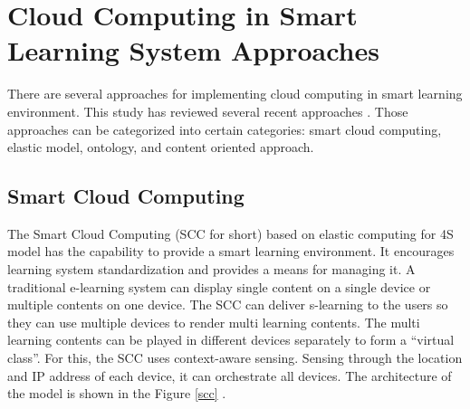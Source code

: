 \documentclass[journal]{vgtc}                %
\begin{document}
\section{Cloud Computing in Smart Learning System Approaches}
There are several approaches for implementing cloud computing in smart learning environment. This study has reviewed several recent approaches \cite{Kim2013,s110807835,jeong2013content,jeong2013cloud,nasr2012proposed}. Those approaches can be categorized into certain categories: smart cloud computing, elastic model, ontology, and content oriented approach.


  \subsection{Smart Cloud Computing}
  The Smart Cloud Computing (SCC for short) based on elastic computing for 4S model has the capability to provide a smart learning environment. It encourages learning system standardization and provides a means for managing it. A traditional e-learning system can display single content on a single device or multiple contents on one device. The SCC can deliver s-learning to the users so they can use multiple devices to render multi learning contents. The multi learning contents can be played in different devices separately to form a “virtual class”. For this, the SCC uses context-aware sensing. Sensing through the location and IP address of each device, it can orchestrate all devices. The architecture of the model is shown in the Figure \ref{scc} \cite{s110807835}.
\end{document}
